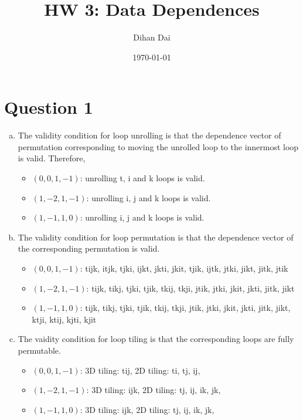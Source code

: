 \documentclass[11pt]{amsart}
\title{HW 3: Data Dependences}
\author{Dihan Dai}
\date{\today}
\begin{document}
\maketitle
\section*{Question 1}
\begin{enumerate}[(a)]
\item The validity condition for loop unrolling is that the dependence vector of permutation corresponding to moving the unrolled loop to the innermost loop is valid. Therefore, 
\begin{itemize}
\item $(0, 0, 1, -1)$: unrolling t, i and k loops is valid.
\item $(1, -2, 1, -1)$: unrolling i, j and k loops is valid.
\item $(1, -1, 1, 0)$: unrolling i, j and k loops is valid.
\end{itemize}
\item The validity condition for loop permutation is that the dependence vector of the corresponding permutation is valid.
\begin{itemize}
\item $(0, 0, 1, -1)$: tijk, itjk, tjki, ijkt, jkti, jkit, tjik, ijtk, jtki, jikt, jitk, jtik
\item $(1, -2, 1, -1)$: tijk, tikj, tjki, tjik, tkij, tkji, jtik, jtki, jkit, jkti, jitk, jikt
\item $(1, -1, 1, 0)$:  tijk, tikj, tjki, tjik, tkij, tkji, jtik, jtki, jkit, jkti, jitk, jikt, ktji, ktij, kjti, kjit
\end{itemize}
\item The vaidity condition for loop tiling is that the corresponding loops are fully permutable.
\begin{itemize}
\item $(0, 0, 1, -1)$: 3D tiling: tij, 2D tiling: ti, tj, ij,
\item $(1, -2, 1, -1)$: 3D tiling: ijk, 2D tiling: tj, ij, ik, jk,
\item $(1, -1, 1, 0)$:  3D tiling: ijk, 2D tiling: tj, ij, ik, jk,
\end{itemize}
\end{enumerate}
\newpage
\end{document}
